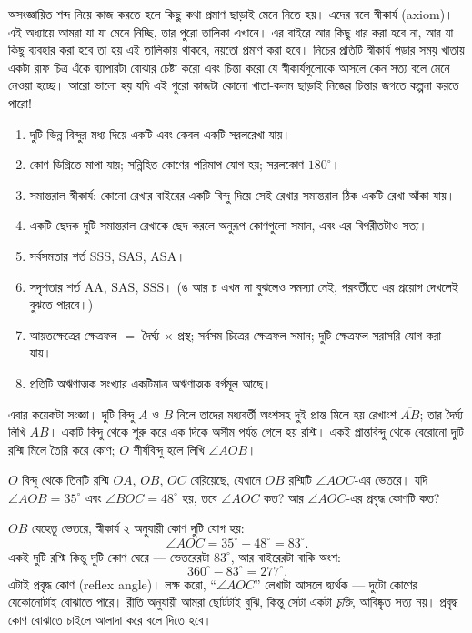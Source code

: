 \documentclass[11pt]{article}
\begin{document}
\begin{idea}[যা আমরা প্রমাণ ছাড়াই মেনে নিচ্ছি]
অসংজ্ঞায়িত শব্দ নিয়ে কাজ করতে হলে কিছু কথা প্রমাণ ছাড়াই মেনে নিতে হয়। এদের বলে
স্বীকার্য (axiom)। এই অধ্যায়ে আমরা যা যা মেনে নিচ্ছি, তার পুরো তালিকা এখানে। এর বাইরে আর কিছু ধার করা হবে না, আর যা কিছু ব্যবহার করা হবে তা হয় এই তালিকায়
থাকবে, নয়তো প্রমাণ করা হবে। নিচের প্রতিটি স্বীকার্য পড়ার সময় খাতায় একটা রাফ চিত্র এঁকে ব্যাপারটা বোঝার চেষ্টা করো এবং চিন্তা করো যে স্বীকার্যগুলোকে আসলে কেন সত্য বলে মেনে নেওয়া হচ্ছে। আরো ভালো হয় যদি এই পুরো কাজটা কোনো খাতা-কলম ছাড়াই নিজের চিন্তার জগতে কল্পনা করতে পারো!
\begin{enumerate}
  \item দুটি ভিন্ন বিন্দুর মধ্য দিয়ে একটি এবং কেবল একটি সরলরেখা যায়।
  \item কোণ ডিগ্রিতে মাপা যায়; সন্নিহিত কোণের পরিমাপ যোগ হয়; সরলকোণ $180^\circ$।
  \item সমান্তরাল স্বীকার্য: কোনো রেখার বাইরের একটি বিন্দু দিয়ে সেই রেখার
        সমান্তরাল ঠিক একটি রেখা আঁকা যায়।
  \item একটি ছেদক দুটি সমান্তরাল রেখাকে ছেদ করলে অনুরূপ কোণগুলো সমান, এবং এর
        বিপরীতটাও সত্য।
  \item সর্বসমতার শর্ত SSS, SAS, ASA।
  \item সদৃশতার শর্ত AA, SAS, SSS। (ঙ আর চ এখন না বুঝলেও সমস্যা নেই, পরবর্তীতে এর প্রয়োগ দেখলেই বুঝতে পারবে।)
  \item আয়তক্ষেত্রের ক্ষেত্রফল $=$ দৈর্ঘ্য $\times$ প্রস্থ; সর্বসম চিত্রের
        ক্ষেত্রফল সমান; দুটি ক্ষেত্রফল সরাসরি যোগ করা যায়।
  \item প্রতিটি অঋণাত্মক সংখ্যার একটিমাত্র অঋণাত্মক বর্গমূল আছে।
\end{enumerate}
\end{idea}

\noindent
এবার কয়েকটা সংজ্ঞা। দুটি বিন্দু $A$ ও $B$ নিলে তাদের মধ্যবর্তী অংশসহ দুই প্রান্ত
মিলে হয় রেখাংশ $\overline{AB}$; তার দৈর্ঘ্য লিখি $AB$। একটি বিন্দু থেকে শুরু করে
এক দিকে অসীম পর্যন্ত গেলে হয় রশ্মি। একই প্রান্তবিন্দু থেকে বেরোনো দুটি রশ্মি
মিলে তৈরি করে কোণ; $O$ শীর্ষবিন্দু হলে লিখি $\angle AOB$।

\begin{example}
$O$ বিন্দু থেকে তিনটি রশ্মি $OA$, $OB$, $OC$ বেরিয়েছে, যেখানে $OB$ রশ্মিটি
$\angle AOC$-এর ভেতরে। যদি $\angle AOB = 35^\circ$ এবং $\angle BOC = 48^\circ$
হয়, তবে $\angle AOC$ কত? আর $\angle AOC$-এর প্রবৃদ্ধ কোণটি কত?
\end{example}

\begin{solbox}
$OB$ যেহেতু ভেতরে, স্বীকার্য ২ অনুযায়ী কোণ দুটি যোগ হয়:
\[
  \angle AOC = 35^\circ + 48^\circ = 83^\circ .
\]
একই দুটি রশ্মি কিন্তু দুটি কোণ ঘেরে --- ভেতরেরটা $83^\circ$, আর বাইরেরটা বাকি
অংশ:
\[
  360^\circ - 83^\circ = 277^\circ .
\]
এটাই প্রবৃদ্ধ কোণ (reflex angle)। লক্ষ করো, ``$\angle AOC$'' লেখাটা আসলে
দ্ব্যর্থক --- দুটো কোণের যেকোনোটাই বোঝাতে পারে। রীতি অনুযায়ী আমরা ছোটটাই বুঝি,
কিন্তু সেটা একটা \emph{চুক্তি}, আবিষ্কৃত সত্য নয়। প্রবৃদ্ধ কোণ বোঝাতে চাইলে
আলাদা করে বলে দিতে হবে।
\end{solbox}
\end{document}
